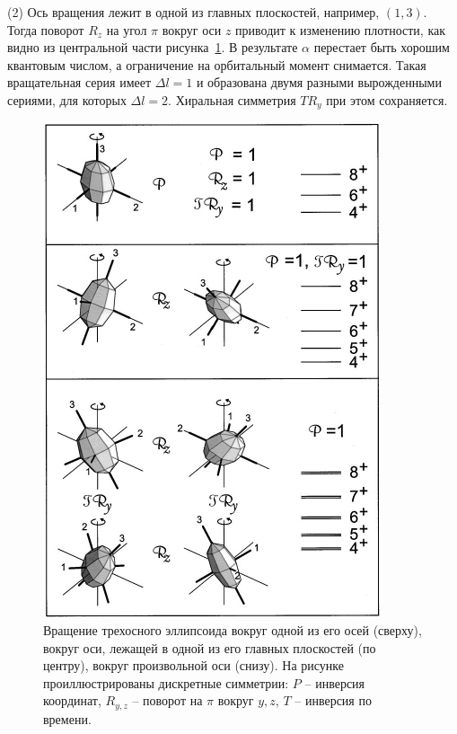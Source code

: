 \documentclass[a4paper, 10pt, twocolumn]{article}
\begin{document}
(2) Ось вращения лежит в одной из главных плоскостей, например, $(1,3)$. 
Тогда поворот $R_z$ на угол $\pi$ вокруг оси $z$ приводит к изменению 
плотности, как видно из центральной части рисунка~\ref{fig:triax}. 
В результате $\alpha$ перестает быть хорошим квантовым числом, 
а ограничение на орбитальный момент снимается. Такая вращательная серия 
имеет $\Delta l = 1$ и образована двумя разными вырожденными сериями, 
для которых $\Delta l = 2$. Хиральная симметрия $TR_y$ при этом 
сохраняется.

\begin{figure}[t]%
	\centering
	\includegraphics[width=.8\linewidth]{figures/triaxial-ellipsoid}
	\caption{Вращение трехосного эллипсоида вокруг одной из его осей 
	(сверху), вокруг оси, лежащей в одной из его главных плоскостей (по 
	центру), вокруг произвольной оси (снизу). На рисунке проиллюстрированы 
	дискретные симметрии: $P$ -- инверсия координат, $R_{y,z}$ -- поворот 
	на $\pi$ вокруг $y,z$, $T$ -- инверсия по времени.}
	\label{fig:triax}
\end{figure}%
\end{document}

